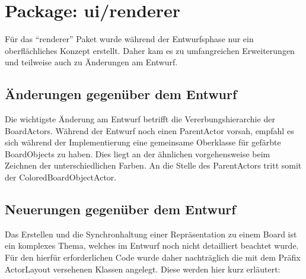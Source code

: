 \section{Package: ui/renderer}

Für das "`renderer"' Paket wurde während der Entwurfsphase nur ein oberflächliches Konzept erstellt.
Daher kam es zu umfangreichen Erweiterungen und teilweise auch zu Änderungen am Entwurf.

\subsection{Änderungen gegenüber dem Entwurf}

Die wichtigste Änderung am Entwurf betrifft die Vererbungshierarchie der BoardActors. 
Während der Entwurf noch einen ParentActor vorsah, empfahl es sich während der Implementierung eine gemeinsame Oberklasse für gefärbte BoardObjects zu haben.
Dies liegt an der ähnlichen vorgehensweise beim Zeichnen der unterschiedlichen Farben.
An die Stelle des ParentActors tritt somit der ColoredBoardObjectActor.

\subsection{Neuerungen gegenüber dem Entwurf}

Das Erstellen und die Synchronhaltung einer Repräsentation zu einem Board ist ein komplexes Thema, welches im Entwurf noch nicht detailliert beachtet wurde.
Für den hierfür erforderlichen Code wurde daher nachträglich die mit dem Präfix ActorLayout versehenen Klassen angelegt.
Diese werden hier kurz erläutert:

